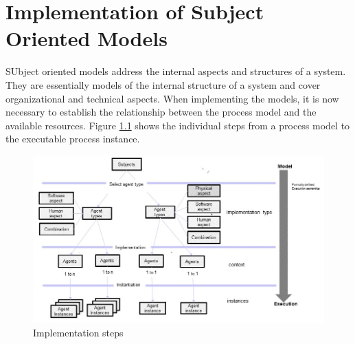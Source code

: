 
\chapter{Implementation of Subject Oriented Models}

SUbject oriented models address the internal aspects and structures of a system. They are essentially models of the internal structure of a system and cover organizational and technical aspects. When implementing the models, it is now necessary to establish the relationship between the process model and the available resources. Figure \ref{fig:Implementation-steps} shows the individual steps from a process model to the executable process instance.

\begin{figure}[h]
	\centering
	\includegraphics[width=0.9\linewidth]{Figures/Implementation/Implementation-steps.jpg}
	\caption[Implementation steps]{Implementation steps}
	\label{fig:Implementation-steps}
\end{figure}
 
